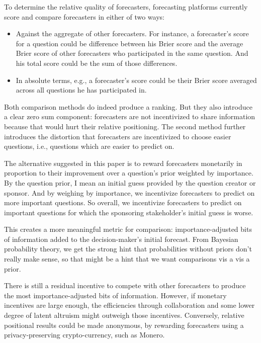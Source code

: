 \documentclass[]{article}
\providecommand{\tightlist}{%
  \setlength{\itemsep}{0pt}\setlength{\parskip}{0pt}}
\begin{document}
To determine the relative quality of forecasters, forecasting platforms
currently score and compare forecasters in either of two ways:

\begin{itemize}
\tightlist
\item
  Against the aggregate of other forecasters. For instance, a
  forecaster's score for a question could be difference between his
  Brier score and the average Brier score of other forecasters who
  participated in the same question. And his total score could be the
  sum of those differences.
\item
  In absolute terms, e.g., a forecaster's score could be their Brier
  score averaged across all questions he has participated in.
\end{itemize}

Both comparison methods do indeed produce a ranking. But they also
introduce a clear zero sum component: forecasters are not incentivized
to share information because that would hurt their relative positioning.
The second method further introduces the distortion that forecasters are
incentivized to choose easier questions, i.e., questions which are
easier to predict on.

The alternative suggested in this paper is to reward forecasters
monetarily in proportion to their improvement over a question's prior
weighted by importance. By the question prior, I mean an initial guess
provided by the question creator or sponsor. And by weighing by
importance, we incentivize forecasters to predict on more important
questions. So overall, we incentivize forecasters to predict on
important questions for which the sponsoring stakeholder's initial guess
is worse.

This creates a more meaningful metric for comparison:
importance-adjusted bits of information added to the decision-maker's
initial forecast. From Bayesian probability theory, we get the strong
hint that probabilities without priors don't really make sense, so that
might be a hint that we want comparisons vis a vis a prior.

There is still a residual incentive to compete with other forecasters to
produce the most importance-adjusted bits of information. However, if
monetary incentives are large enough, the efficiencies through
collaboration and some lower degree of latent altruism might outweigh
those incentives. Conversely, relative positional results could be made
anonymous, by rewarding forecasters using a privacy-preserving
crypto-currency, such as Monero.
\end{document}
